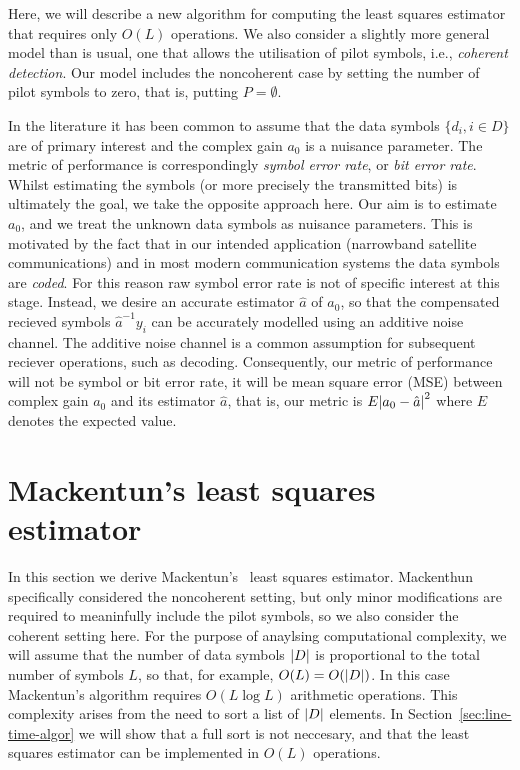 \documentclass[a4paper,10pt]{article}
\begin{document}
Here, we will describe a new algorithm for computing the least squares estimator that requires only $O(L)$ operations.  We also consider a slightly more general model than is usual, one that allows the utilisation of pilot symbols, i.e., \emph{coherent detection}.  Our model includes the noncoherent case by setting the number of pilot symbols to zero, that is, putting $P = \emptyset$.

In the literature it has been common to assume that the data symbols $\{d_i, i \in D\}$ are of primary interest and the complex gain $a_0$ is a nuisance parameter.  The metric of performance is correspondingly \emph{symbol error rate}, or \emph{bit error rate}.  Whilst estimating the symbols (or more precisely the transmitted bits) is ultimately the goal, we take the opposite approach here.  Our aim is to estimate $a_0$, and we treat the unknown data symbols as nuisance parameters.  This is motivated by the fact that in our intended application (narrowband satellite communications) and in most modern communication systems the data symbols are \emph{coded}.  For this reason raw symbol error rate is not of specific interest at this stage.  Instead, we desire an accurate estimator $\hat{a}$ of $a_0$, so that the compensated recieved symbols $\hat{a}^{-1}y_i$ can be accurately modelled using an additive noise channel.  The additive noise channel is a common assumption for subsequent reciever operations, such as decoding.  Consequently, our metric of performance will not be symbol or bit error rate, it will be mean square error (MSE) between complex gain $a_0$ and its estimator $\hat{a}$, that is, our metric is $E{\left| a_0 - \hat{a} \right|}^2$ where $E$ denotes the expected value.

\section{Mackentun's least squares estimator}\label{sec:least-squar-estim}

In this section we derive Mackentun's~\cite{Mackenthun1994} least squares estimator.  Mackenthun specifically considered the noncoherent setting, but only minor modifications are required to meaninfully include the pilot symbols, so we also consider the coherent setting here.  For the purpose of anaylsing computational complexity, we will assume that the number of data symbols ${\left| D \right|}$ is proportional to the total number of symbols $L$, so that, for example, $O(L) = O({\left| D \right|})$.  In this case Mackentun's algorithm requires $O(L \log L)$ arithmetic operations.  This complexity arises from the need to sort a list of ${\left| D \right|}$ elements.  In Section~\ref{sec:line-time-algor} we will show that a full sort is not neccesary, and that the least squares estimator can be implemented in $O(L)$ operations.
\end{document}
